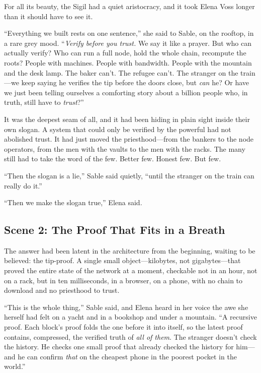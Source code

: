 \documentclass[12pt,letterpaper]{book}
\begin{document}
For all its beauty, the Sigil had a quiet aristocracy, and it took Elena Voss longer
than it should have to see it.

``Everything we built rests on one sentence,'' she said to Sable, on the rooftop, in
a rare grey mood. ``\emph{Verify before you trust.} We say it like a prayer. But who
can actually verify? Who can run a full node, hold the whole chain, recompute the
roots? People with machines. People with bandwidth. People with the mountain and the
desk lamp. The baker can't. The refugee can't. The stranger on the train---we keep
saying he verifies the tip before the doors close, but \emph{can} he? Or have we just
been telling ourselves a comforting story about a billion people who, in truth, still
have to \emph{trust}?''

It was the deepest seam of all, and it had been hiding in plain sight inside their
own slogan. A system that could only be verified by the powerful had not abolished
trust. It had just moved the priesthood---from the bankers to the node operators,
from the men with the vaults to the men with the racks. The many still had to take
the word of the few. Better few. Honest few. But few.

``Then the slogan is a lie,'' Sable said quietly, ``until the stranger on the train
can really do it.''

``Then we make the slogan true,'' Elena said.

\hypertarget{scene-2-the-proof-that-fits-in-a-breath}{%
\subsection{Scene 2: The Proof That Fits in a
Breath}\label{scene-2-the-proof-that-fits-in-a-breath}}

The answer had been latent in the architecture from the beginning, waiting to be
believed: the tip-proof. A single small object---kilobytes, not gigabytes---that
proved the entire state of the network at a moment, checkable not in an hour, not on
a rack, but in ten milliseconds, in a browser, on a phone, with no chain to download
and no priesthood to trust.

``This is the whole thing,'' Sable said, and Elena heard in her voice the awe she
herself had felt on a yacht and in a bookshop and under a mountain. ``A recursive
proof. Each block's proof folds the one before it into itself, so the latest proof
contains, compressed, the verified truth of \emph{all of them}. The stranger doesn't
check the history. He checks one small proof that already checked the history for
him---and he can confirm \emph{that} on the cheapest phone in the poorest pocket in
the world.''
\end{document}
